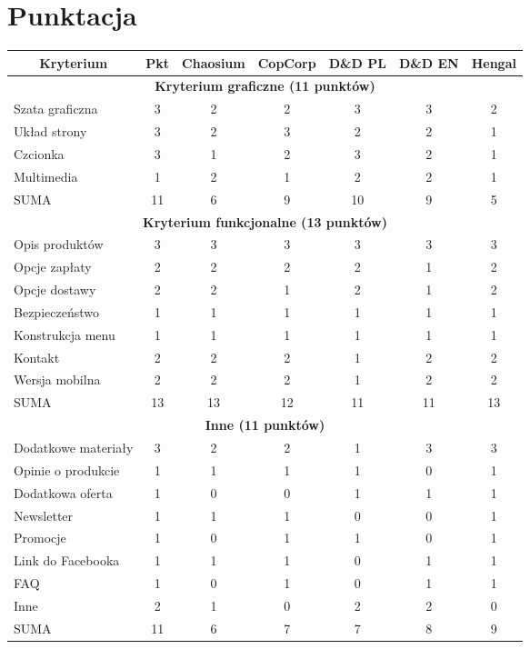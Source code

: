 \documentclass[a4paper,11pt]{article}
\begin{document}
\section {Punktacja}

\begin{tabular}{|l|c||c|c|c|c|c|}
	\hline
	
	\multicolumn{1}{|c}{\textbf{Kryterium}} & \multicolumn{1}{|c||}{\textbf{Pkt}} & \multicolumn{1}{c}{\textbf{Chaosium}} & \multicolumn{1}{|c}{\textbf{CopCorp}} & \multicolumn{1}{|c}{\textbf{D\&D PL}} &\multicolumn{1}{|c}{\textbf{D\&D EN}} &\multicolumn{1}{|c|}{\textbf{Hengal}}\\
	\hline \hline
	
	\multicolumn{7}{|c|}{\textbf{Kryterium graficzne (11 punktów)}} \\
	\hline
	Szata graficzna & 3 & 2 & 2 & 3 & 3 & 2 \\
	\hline
	Układ strony & 3 & 2 & 3 & 2 & 2 & 1 \\ 
	\hline
	Czcionka & 3 & 1 & 2 & 3 & 2 & 1 \\ 
	\hline
	Multimedia & 1 & 2 & 1 & 2 & 2 & 1 \\ 
	\hline \hline
	SUMA & 11 & 6 & 9 & 10 & 9 & 5 \\ 
	\hline \hline

	\multicolumn{7}{|c|}{\textbf{Kryterium funkcjonalne (13 punktów)}} \\
	\hline
	Opis produktów & 3 & 3 & 3 & 3 & 3 & 3 \\ 
	\hline
	Opcje zapłaty & 2 & 2 & 2 & 2 & 1 & 2 \\ 
	\hline
	Opcje dostawy & 2 & 2 & 1 & 2 & 1 & 2 \\ 
	\hline
	Bezpieczeństwo & 1 & 1 & 1 & 1 & 1 & 1 \\ 
	\hline
	Konstrukcja menu & 1 & 1 & 1 & 1 & 1 & 1 \\ 
	\hline
	Kontakt & 2 & 2 & 2 & 1 & 2 & 2 \\ 
	\hline
	Wersja mobilna & 2 & 2 & 2 & 1 & 2 & 2 \\ 
	\hline \hline
	SUMA & 13 & 13 & 12 & 11 & 11 & 13 \\ 
	\hline \hline
	
	\multicolumn{7}{|c|}{\textbf{Inne (11 punktów)}} \\
	\hline
	Dodatkowe materiały & 3 & 2 & 2 & 1 & 3 & 3 \\ 
	\hline
	Opinie o produkcie & 1 & 1 & 1 & 1 & 0 & 1 \\ 
	\hline
	Dodatkowa oferta & 1 & 0 & 0 & 1 & 1 & 1 \\ 
	\hline
	Newsletter & 1 & 1 & 1 & 0 & 0 & 1 \\ 
	\hline
	Promocje & 1 & 0 & 1 & 1 & 0 & 1 \\ 
	\hline
	Link do Facebooka & 1 & 1 & 1 & 0 & 1 & 1 \\ 
	\hline
	FAQ & 1 & 0 & 1 & 0 & 1 & 1 \\ 
	\hline
	Inne & 2 & 1 & 0 & 2 & 2 & 0 \\ 
	\hline \hline
	SUMA & 11 & 6 & 7 & 7 & 8 & 9 \\ 
	\hline \hline
	

\end{tabular}
\end{document}
